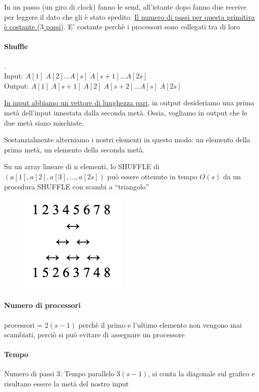 In un passo (un giro di clock) fanno le send, all'istante dopo fanno due receive per leggere il dato che gli è stato spedito. \uline{Il numero di passi per questa primitiva è costante ($3$ passi)}. E' costante perchè i processori sono collegati tra di loro

\paragraph{Shuffle}.\\
Input: $A[1]\;A[2]\dots A[s]\;A[s+1]\dots A[2s]$\\
Output: $A[1]\;A[s+1]\;A[2]\;A[s+2]\dots A[s]\;A[2s]$

\uline{In input abbiamo un vettore di lunghezza pari}, in output desideriamo una prima metà dell'input innestata dalla seconda metà. Ossia, vogliamo in output che le due metà siano mischiate.

Sostanzialmente alterniamo i nostri elementi in questo modo: un elemento della prima metà, un elemento della seconda metà.

Su un array lineare di n elementi, lo SHUFFLE di $(a[1], a[2], a[3], \dots, a[2s])$ può essere ottenuto in tempo $O(s)$ da un procedura SHUFFLE con scambi a “triangolo”

\begin{figure}[h]
    \centering
    \includegraphics[scale=0.40]{images/shuffle.png}
\end{figure}

\paragraph{Numero di processori}
processori = $2(s-1)$ perchè il primo e l'ultimo elemento non vengono mai scambiati, perciò si può evitare di assegnare un processore

\paragraph{Tempo}
Numero di passi $3$. Tempo parallelo $3(s-1)$, si conta la diagonale sul grafico e risultano essere la metà del nostro input

